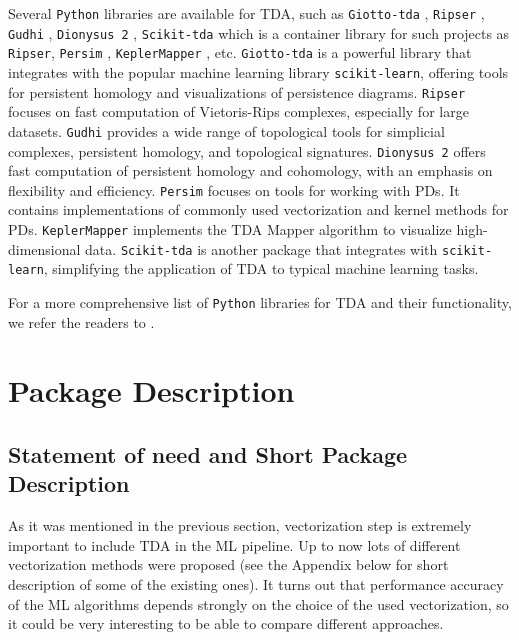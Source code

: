 \documentclass[conference, onecolumn]{IEEEtran}
\begin{document}
Several \texttt{Python} libraries are available for TDA, such as \texttt{Giotto-tda} \cite{tauzin2021giotto}, \texttt{Ripser} \cite{christopher2018lean}, \texttt{Gudhi} \cite{rouvreau2020gudhi}, \texttt{Dionysus 2} \cite{Dionysus2}, \texttt{Scikit-tda} \cite{scikittda2019} which is a container library for such projects as  \texttt{Ripser}, \texttt{Persim} \cite{Persim},  \texttt{KeplerMapper} \cite{van2019kepler}, etc. \texttt{Giotto-tda} is a powerful library that integrates with the popular machine learning library \texttt{scikit-learn}, offering tools for persistent homology and visualizations of persistence diagrams. \texttt{Ripser} focuses on fast computation of Vietoris-Rips complexes, especially for large datasets. \texttt{Gudhi} provides a wide range of topological tools for simplicial complexes, persistent homology, and topological signatures. \texttt{Dionysus 2} offers fast computation of persistent homology and cohomology, with an emphasis on flexibility and efficiency. \texttt{Persim} focuses on tools for working with PDs. It contains implementations of commonly used vectorization and kernel methods for PDs. \texttt{KeplerMapper} implements the TDA Mapper algorithm to visualize high-dimensional data. \texttt{Scikit-tda} is another package that integrates with \texttt{scikit-learn}, simplifying the application of TDA to typical machine learning tasks. 

For a more comprehensive list of \texttt{Python} libraries for TDA and their functionality, we refer the readers to \cite{awesome-tda:2024}.

\section{Package Description}
\label{sec:package-description}



\subsection{Statement of need and Short Package Description}

As it was mentioned in the previous section, vectorization step is extremely important to include TDA in the ML pipeline. Up to now lots of different vectorization methods were proposed (see the Appendix below for short description of some of the existing ones). It turns out that performance accuracy of the ML algorithms depends strongly on the choice of the used vectorization, so it could be very interesting to be able to compare different approaches.
\end{document}
